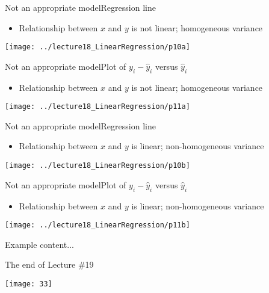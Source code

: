 \documentclass[xcolor=dvipsnames]{beamer}
\begin{document}
\begin{frame}{Not an appropriate model}{Regression line}
\begin{itemize}
	\item Relationship between $x$ and $y$ is not linear; homogeneous variance
\end{itemize}
\begin{center}
	\texttt{[image: ../lecture18\_LinearRegression/p10a]}
\end{center}
\end{frame}

\begin{frame}{Not an appropriate model}{Plot of $y_i - \hat{y}_i$ versus $\hat{y}_i$}
\begin{itemize}
\item Relationship between $x$ and $y$ is not linear; homogeneous variance
\end{itemize}
\begin{center}
\texttt{[image: ../lecture18\_LinearRegression/p11a]}
\end{center}
\end{frame}

\begin{frame}{Not an appropriate model}{Regression line}
\begin{itemize}
	\item Relationship between $x$ and $y$ is linear; non-homogeneous variance
\end{itemize}
\begin{center}
	\texttt{[image: ../lecture18\_LinearRegression/p10b]}
\end{center}
\end{frame}

\begin{frame}{Not an appropriate model}{Plot of $y_i - \hat{y}_i$ versus $\hat{y}_i$}
\begin{itemize}
\item Relationship between $x$ and $y$ is linear; non-homogeneous variance
\end{itemize}
\begin{center}
\texttt{[image: ../lecture18\_LinearRegression/p11b]}
\end{center}
\end{frame}

\begin{frame}{Example}
	content...
\end{frame}

\begin{frame}{The end of Lecture \#19}
	\begin{center}
		\texttt{[image: 33]}
	\end{center}
\end{frame}
\end{document}

